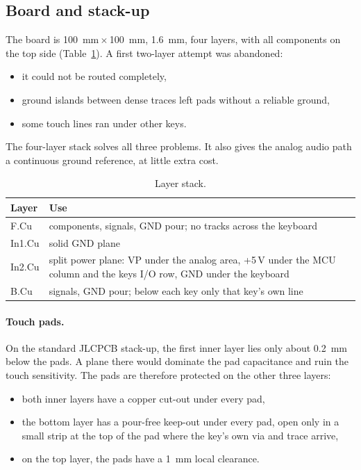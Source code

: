 \documentclass[11pt,a4paper]{article}
\begin{document}
\subsection{Board and stack-up}
The board is \SI{100}{mm}\,$\times$\,\SI{100}{mm}, \SI{1.6}{mm}, four layers, with all components on the
top side (Table~\ref{tab:stack}). A first two-layer attempt was abandoned:
\begin{itemize}
  \item it could not be routed completely,
  \item ground islands between dense traces left pads without a reliable ground,
  \item some touch lines ran under other keys.
\end{itemize}
The four-layer stack solves all three problems. It also gives the analog audio path a continuous ground
reference, at little extra cost.

\begin{table}[h]
\centering\small
\caption{Layer stack.}\label{tab:stack}
\begin{tabularx}{\textwidth}{@{}l X@{}}
\toprule
Layer & Use \\
\midrule
F.Cu & components, signals, GND pour; no tracks across the keyboard \\
In1.Cu & solid GND plane \\
In2.Cu & split power plane: VP under the analog area, +5\,V under the MCU column and the keys I/O row, GND under the keyboard \\
B.Cu & signals, GND pour; below each key only that key's own line \\
\bottomrule
\end{tabularx}
\end{table}

\paragraph{Touch pads.} On the standard JLCPCB stack-up, the first inner layer lies only about
\SI{0.2}{mm} below the pads. A plane there would dominate the pad capacitance and ruin the touch
sensitivity. The pads are therefore protected on the other three layers:
\begin{itemize}
  \item both inner layers have a copper cut-out under every pad,
  \item the bottom layer has a pour-free keep-out under every pad, open only in a small strip at the top of
    the pad where the key's own via and trace arrive,
  \item on the top layer, the pads have a \SI{1}{mm} local clearance.
\end{itemize}
\end{document}
